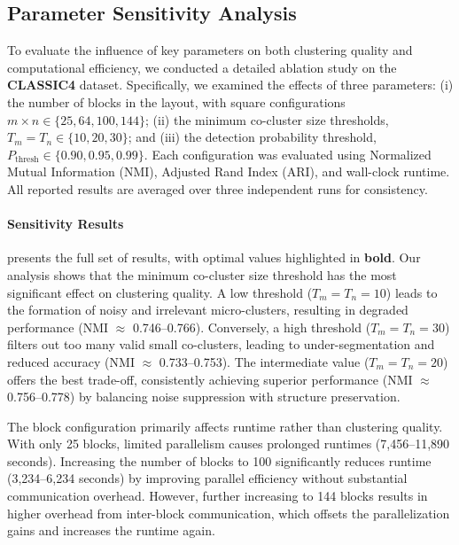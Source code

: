 \documentclass[journal]{IEEEtran}
\theoremstyle{definition}
\theoremstyle{remark} %
\begin{document}
{\color{blue}
\subsection{Parameter Sensitivity Analysis}
\label{subsec:param-sensitivity}

To evaluate the influence of key parameters on both clustering quality and computational efficiency, we conducted a detailed ablation study on the \textbf{CLASSIC4} dataset. Specifically, we examined the effects of three parameters: (i) the number of blocks in the layout, with square configurations $m \times n \in \{25, 64, 100, 144\}$; (ii) the minimum co-cluster size thresholds, $T_m = T_n \in \{10, 20, 30\}$; and (iii) the detection probability threshold, $P_{\text{thresh}} \in \{0.90, 0.95, 0.99\}$. Each configuration was evaluated using Normalized Mutual Information (NMI), Adjusted Rand Index (ARI), and wall-clock runtime. All reported results are averaged over three independent runs for consistency.

\paragraph{Sensitivity Results}
 presents the full set of results, with optimal values highlighted in \textbf{bold}. Our analysis shows that the minimum co-cluster size threshold has the most significant effect on clustering quality. A low threshold ($T_m = T_n = 10$) leads to the formation of noisy and irrelevant micro-clusters, resulting in degraded performance (NMI $\approx$ 0.746--0.766). Conversely, a high threshold ($T_m = T_n = 30$) filters out too many valid small co-clusters, leading to under-segmentation and reduced accuracy (NMI $\approx$ 0.733--0.753). The intermediate value ($T_m = T_n = 20$) offers the best trade-off, consistently achieving superior performance (NMI $\approx$ 0.756--0.778) by balancing noise suppression with structure preservation.

The block configuration primarily affects runtime rather than clustering quality. With only 25 blocks, limited parallelism causes prolonged runtimes (7,456--11,890 seconds). Increasing the number of blocks to 100 significantly reduces runtime (3,234--6,234 seconds) by improving parallel efficiency without substantial communication overhead. However, further increasing to 144 blocks results in higher overhead from inter-block communication, which offsets the parallelization gains and increases the runtime again.

}
\end{document}
